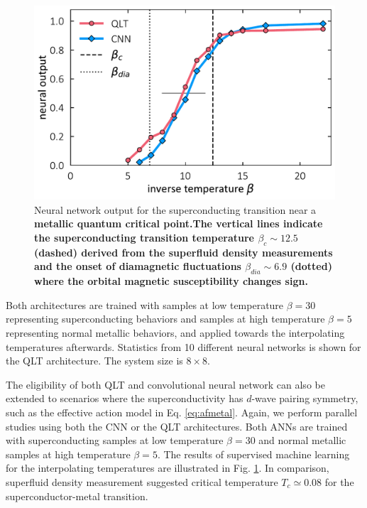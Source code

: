 \documentclass[amsmath,amssymb, aps, prx, longbibliography, twocolumn]{revtex4-1}
\begin{document}
\begin{figure}
\includegraphics[scale=.43]{fig3.pdf}
\caption{Neural network output for the superconducting transition near a {\bf metallic quantum critical point.The vertical lines indicate the superconducting transition temperature $\beta_c\sim 12.5$ (dashed) derived from the superfluid density measurements and the onset of diamagnetic fluctuations $\beta_{dia} \sim 6.9$ (dotted) where the orbital magnetic susceptibility changes sign\cite{Erez2016}.}}
\label{fig:afmetal}
\end{figure}


Both architectures are trained with samples at low temperature $\beta=30$ representing superconducting behaviors and samples at high temperature $\beta=5$ representing normal metallic behaviors, and applied towards the interpolating temperatures afterwards. Statistics from 10 different neural networks is shown for the QLT architecture. The system size is $8\times 8$. 

The eligibility of both QLT and convolutional neural network can also be extended to scenarios where the superconductivity has $d$-wave pairing symmetry, such as the effective action model in Eq. \ref{eq:afmetal}. Again, we perform parallel studies using both the CNN or the QLT architectures. Both ANNs are trained with superconducting samples at low temperature $\beta=30$ and normal metallic samples at high temperature $\beta=5$. The results of supervised machine learning for the interpolating temperatures are illustrated in Fig. \ref{fig:afmetal}. In comparison, superfluid density measurement suggested critical temperature $T_c\simeq 0.08$ for the superconductor-metal transition\cite{Erez2016}.

\end{document}

